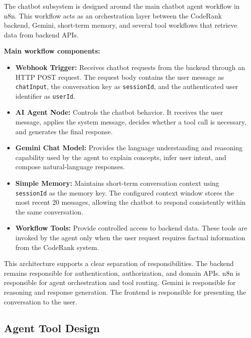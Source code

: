The chatbot subsystem is designed around the main chatbot agent workflow in n8n. This workflow acts as an orchestration layer between the CodeRank backend, Gemini, short-term memory, and several tool workflows that retrieve data from backend APIs.

\textbf{Main workflow components:}
\begin{itemize}
    \item \textbf{Webhook Trigger:} Receives chatbot requests from the backend through an HTTP POST request. The request body contains the user message as \texttt{chatInput}, the conversation key as \texttt{sessionId}, and the authenticated user identifier as \texttt{userId}.
    
    \item \textbf{AI Agent Node:} Controls the chatbot behavior. It receives the user message, applies the system message, decides whether a tool call is necessary, and generates the final response.
    
    \item \textbf{Gemini Chat Model:} Provides the language understanding and reasoning capability used by the agent to explain concepts, infer user intent, and compose natural-language responses.
    
    \item \textbf{Simple Memory:} Maintains short-term conversation context using \texttt{sessionId} as the memory key. The configured context window stores the most recent 20 messages, allowing the chatbot to respond consistently within the same conversation.
    
    \item \textbf{Workflow Tools:} Provide controlled access to backend data. These tools are invoked by the agent only when the user request requires factual information from the CodeRank system.
\end{itemize}

This architecture supports a clear separation of responsibilities. The backend remains responsible for authentication, authorization, and domain APIs. n8n is responsible for agent orchestration and tool routing. Gemini is responsible for reasoning and response generation. The frontend is responsible for presenting the conversation to the user.

\subsection{Agent Tool Design}

